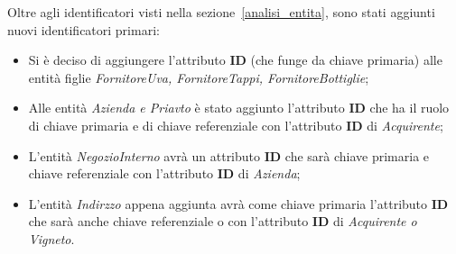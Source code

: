 Oltre agli identificatori visti nella sezione~\ref{analisi_entita}, sono stati aggiunti nuovi identificatori primari:

\begin{itemize}
	\item Si è deciso di aggiungere l'attributo \textbf{ID} (che funge da chiave primaria) alle entità figlie \emph{FornitoreUva, FornitoreTappi, FornitoreBottiglie};
	\item Alle entità \emph{Azienda e Priavto} è stato aggiunto l'attributo \textbf{ID} che ha il ruolo di chiave primaria e di chiave referenziale con l'attributo \textbf{ID} di \emph{Acquirente};
	\item L'entità \emph{NegozioInterno} avrà un attributo \textbf{ID} che sarà chiave primaria e chiave referenziale con l'attributo \textbf{ID} di \emph{Azienda};
	\item L'entità \emph{Indirzzo} appena aggiunta avrà come chiave primaria l'attributo \textbf{ID} che sarà anche chiave referenziale o con l'attributo \textbf{ID} di \emph{Acquirente o Vigneto}.
\end{itemize}